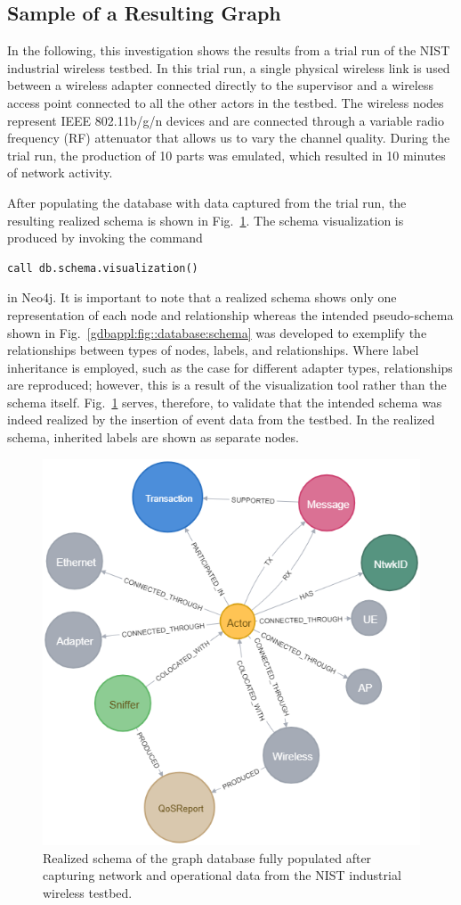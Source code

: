 \subsection{Sample of a Resulting Graph}
In the following, this investigation shows the results from a trial run of the NIST industrial wireless testbed. In this trial run, a single physical wireless link is used between a wireless adapter connected directly to the supervisor and a wireless access point connected to all the other actors in the testbed. The wireless nodes represent IEEE 802.11b/g/n devices and are connected through a variable radio frequency (RF) attenuator that allows us to vary the channel quality. During the trial run, the production of 10 parts was emulated, which resulted in 10 minutes of network activity.       

After populating the database with data captured from the trial run, the resulting realized schema is shown in Fig.~\ref{gdbappl:fig::real-schema}. The schema visualization is produced by invoking the command

\begin{lstlisting}
call db.schema.visualization()
\end{lstlisting} 
in Neo4j. It is important to note that a realized schema shows only one representation of each node and relationship whereas the intended pseudo-schema shown in Fig.~\ref{gdbappl:fig::database:schema} was developed to exemplify the relationships between types of nodes, labels, and relationships. Where label inheritance is employed, such as the case for different adapter types, relationships are reproduced; however, this is a result of the visualization tool rather than the schema itself.  Fig.~\ref{gdbappl:fig::real-schema} serves, therefore, to validate that the intended schema was indeed realized by the insertion of event data from the testbed. In the realized schema, inherited labels are shown as separate nodes.

\begin{figure}[!ht]
    \centering
    \includegraphics[width=0.65\columnwidth]{./chapter-gdb-appl/figures/database/graph_schema.png}
    \caption{Realized schema of the graph database fully populated after capturing network and operational data from the NIST industrial wireless testbed. }
    \label{gdbappl:fig::real-schema}
\end{figure}


